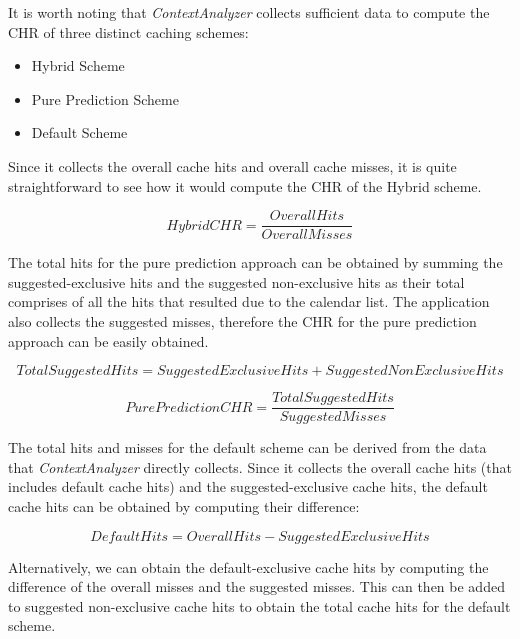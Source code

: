 \documentclass[12pt]{uthesis-v12}  %
\begin{document}
		It is worth noting that {\em ContextAnalyzer} collects sufficient data to compute the CHR of three distinct caching schemes:
		
		\begin{itemize}			
			\item Hybrid Scheme
			\item Pure Prediction Scheme
			\item Default Scheme
		\end{itemize}
		
		Since it collects the overall cache hits and overall cache misses, it is quite straightforward to see how it would compute the CHR of the Hybrid scheme.
		
		\begin{equation}
			Hybrid CHR = \frac{Overall Hits}{Overall Misses}
		\end{equation}
		
		The total hits for the pure prediction approach can be obtained by summing the suggested-exclusive hits and the suggested non-exclusive hits as their total comprises of all the hits that resulted due to the calendar list. The application also collects the suggested misses, therefore the CHR for the pure prediction approach can be easily obtained.
		
		\begin{equation}
			Total Suggested Hits = SuggestedExclusive  Hits + Suggested NonExclusive  Hits			
		\end{equation}
		
		\begin{equation}			
			Pure Prediction CHR = \frac{Total Suggested Hits}{Suggested Misses}
		\end{equation}
		
		The total hits and misses for the default scheme can be derived from the data that {\em ContextAnalyzer} directly collects. Since it collects the overall cache hits (that includes default cache hits) and the suggested-exclusive cache hits, the default cache hits can be obtained by computing their difference:
		
		\begin{equation}
			Default Hits = Overall Hits - Suggested Exclusive Hits
		\end{equation}
		
		Alternatively, we can obtain the default-exclusive cache hits by computing the difference of the overall misses and the suggested misses. This can then be added to suggested non-exclusive cache hits to obtain the total cache hits for the default scheme.
		
\end{document}
